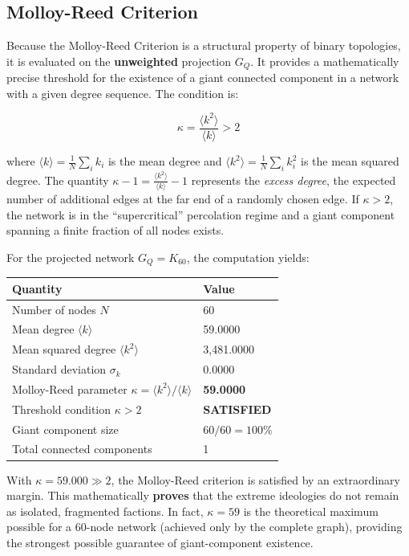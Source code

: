 \documentclass[11pt, a4paper]{article}
\begin{document}
\subsection{Molloy-Reed Criterion}

Because the Molloy-Reed Criterion is a structural property of binary topologies, it is evaluated on the \textbf{unweighted} projection $G_Q$. It provides a mathematically precise threshold for the existence of a giant connected component in a network with a given degree sequence. The condition is:

$$\kappa = \frac{\langle k^2 \rangle}{\langle k \rangle} > 2$$

where $\langle k \rangle = \frac{1}{N}\sum_i k_i$ is the mean degree and $\langle k^2 \rangle = \frac{1}{N}\sum_i k_i^2$ is the mean squared degree. The quantity $\kappa - 1 = \frac{\langle k^2 \rangle}{\langle k \rangle} - 1$ represents the \textit{excess degree}, the expected number of additional edges at the far end of a randomly chosen edge. If $\kappa > 2$, the network is in the ``supercritical'' percolation regime and a giant component spanning a finite fraction of all nodes exists.

For the projected network $G_Q = K_{60}$, the computation yields:

\begin{center}
\begin{tabular}{ll}
\toprule
\textbf{Quantity} & \textbf{Value} \\
\midrule
Number of nodes $N$ & 60 \\
Mean degree $\langle k \rangle$ & 59.0000 \\
Mean squared degree $\langle k^2 \rangle$ & 3,481.0000 \\
Standard deviation $\sigma_k$ & 0.0000 \\
Molloy-Reed parameter $\kappa = \langle k^2 \rangle / \langle k \rangle$ & \textbf{59.0000} \\
Threshold condition $\kappa > 2$ & \textbf{SATISFIED} \\
Giant component size & $60/60 = 100\%$ \\
Total connected components & 1 \\
\bottomrule
\end{tabular}
\end{center}

With $\kappa = 59.000 \gg 2$, the Molloy-Reed criterion is satisfied by an extraordinary margin. This mathematically \textbf{proves} that the extreme ideologies do not remain as isolated, fragmented factions. In fact, $\kappa = 59$ is the theoretical maximum possible for a 60-node network (achieved only by the complete graph), providing the strongest possible guarantee of giant-component existence.
\end{document}
